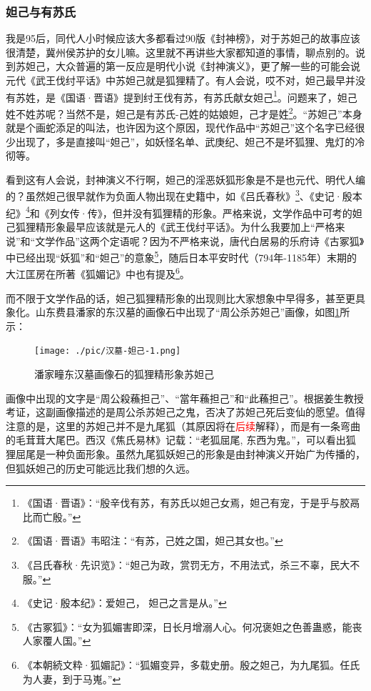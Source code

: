 \documentclass[UTF8, 12pt, A4paper]{article}
\begin{document}
\subsubsection{妲己与有苏氏}

我是95后，同代人小时候应该大多都看过90版《封神榜》，对于苏妲己的故事应该很清楚，冀州侯苏护的女儿嘛。这里就不再讲些大家都知道的事情，聊点别的。说到苏妲己，大众普遍的第一反应是明代小说《封神演义》，更了解一些的可能会说元代《武王伐纣平话》中苏妲己就是狐狸精了。有人会说，哎不对，妲己最早并没有苏姓，是《国语·晋语》提到纣王伐有苏，有苏氏献女妲己\footnote{《国语·晋语》：“殷辛伐有苏，有苏氏以妲己女焉，妲己有宠，于是乎与胶鬲比而亡殷。”}。问题来了，妲己姓不姓苏呢？当然不是，妲己是有苏氏-己姓的姑娘妲，己才是姓\footnote{《国语·晋语》韦昭注：“有苏，己姓之国，妲己其女也。”}。“苏妲己”本身就是个画蛇添足的叫法，也许因为这个原因，现代作品中“苏妲己”这个名字已经很少出现了，多是直接叫“妲己”，如妖怪名单、武庚纪、妲己不是坏狐狸、鬼灯的冷彻等。

看到这有人会说，封神演义不行啊，妲己的淫恶妖狐形象是不是也元代、明代人编的？虽然妲己很早就作为负面人物出现在史籍中，如《吕氏春秋》\footnote{《吕氏春秋·先识览》：“妲己为政，赏罚无方，不用法式，杀三不辜，民大不服。”}、《史记·殷本纪》\footnote{《史记·殷本纪》：爱妲己， 妲己之言是从。”}和《列女传·传》，但并没有狐狸精的形象。严格来说，文学作品中可考的妲己狐狸精形象最早应该就是元人的《武王伐纣平话》。为什么我要加上“严格来说”和“文学作品”这两个定语呢？因为不严格来说，唐代白居易的乐府诗《古冢狐》中已经出现“妖狐”和“妲己”的意象\footnote{《古冢狐》：“女为狐媚害即深，日长月增溺人心。何况褒妲之色善蛊惑，能丧人家覆人国。”}，随后日本平安时代（794年-1185年）末期的大江匡房在所著《狐媚记》中也有提及\footnote{《本朝続文粋·狐媚記》：“狐媚变异，多载史册。殷之妲己，为九尾狐。任氏为人妻，到于马嵬。”}。

而不限于文学作品的话，妲己狐狸精形象的出现则比大家想象中早得多，甚至更具象化。山东费县潘家的东汉墓的画像石中出现了“周公杀苏妲己”画像，如图\ref{fig:hanmu-daji-1}所示：

\begin{figure}[ht]
    \centering
    \texttt{[image: ./pic/汉墓-妲己-1.png]}
    \caption{潘家疃东汉墓画像石的狐狸精形象苏妲己}
    \label{fig:hanmu-daji-1}
\end{figure}

画像中出现的文字是“周公殺蘓担己”、“當年蘓担己”和“此蘓担己”。根据姜生教授考证，这副画像描述的是周公杀苏妲己之鬼，否决了苏妲己死后变仙的愿望。值得注意的是，这里的苏妲己并不是九尾狐（其原因将在\textcolor{red}{后续}解释），而是有一条弯曲的毛茸茸大尾巴。西汉《焦氏易林》记载：“老狐屈尾, 东西为鬼。”，可以看出狐狸屈尾是一种负面形象。虽然九尾狐妖妲己的形象是由封神演义开始广为传播的，但狐妖妲己的历史可能远比我们想的久远。
\end{document}
